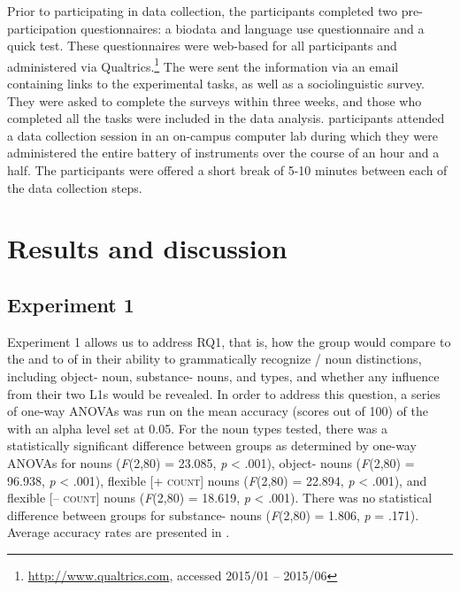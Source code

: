 \documentclass[output=paper]{langsci/langscibook}
\begin{document}
Prior to participating in data collection, the participants completed two pre-participation questionnaires: a biodata and language use questionnaire and a quick  test. These questionnaires were web-based for all participants and administered via Qualtrics.\footnote{\url{http://www.qualtrics.com}, accessed 2015/01 -- 2015/06} The  were sent the information via an email containing links to the experimental tasks, as well as a sociolinguistic survey. They were asked to complete the surveys within three weeks, and those who completed all the tasks were included in the data analysis.   participants attended a data collection session in an on-campus computer lab during which they were administered the entire battery of instruments over the course of an hour and a half. The participants were offered a short break of 5-10 minutes between each of the data collection steps. 


\section{Results and discussion}


\subsection{Experiment 1}


Experiment 1 allows us to address RQ1, that is, how the  group would compare to the  and to  of  in their ability to grammatically recognize / noun distinctions, including object- noun, substance- nouns, and  types, and whether any influence from their two L1s would be revealed.  In order to address this question, a series of one-way ANOVAs was run on the mean accuracy (scores out of 100) of the  with an alpha level set at 0.05. For the noun types tested, there was a statistically significant difference between groups as determined by one-way ANOVAs for  nouns (\textit{F}(2,80) = 23.085, \textit{p} < .001), object- nouns (\textit{F}(2,80) = 96.938, \textit{p} < .001), flexible [+ \textsc{count}] nouns (\textit{F}(2,80) = 22.894, \textit{p} < .001), and flexible [– \textsc{count}] nouns (\textit{F}(2,80) = 18.619, \textit{p} < .001). There was no statistical difference between groups for substance- nouns (\textit{F}(2,80) = 1.806, \textit{p} = .171). Average accuracy rates are presented in .
 
\end{document}
